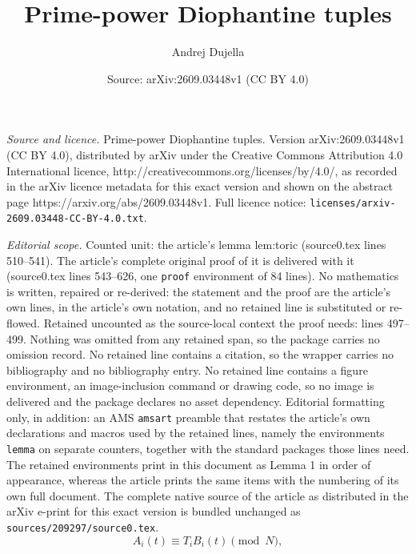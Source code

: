\documentclass[10pt,a4paper]{amsart}
\title{Prime-power Diophantine tuples}
\author{Andrej Dujella}
\date{Source: arXiv:2609.03448v1 (CC BY 4.0)}
\begin{document}
\maketitle

\noindent\emph{Source and licence.} Prime-power Diophantine tuples. Version arXiv:2609.03448v1 (CC BY 4.0), distributed by arXiv under the Creative Commons Attribution 4.0 International licence, http://creativecommons.org/licenses/by/4.0/, as recorded in the arXiv licence metadata for this exact version and shown on the abstract page https://arxiv.org/abs/2609.03448v1. Full licence notice: \texttt{licenses/arxiv-2609.03448-CC-BY-4.0.txt}.\par\smallskip

\noindent\textit{Editorial scope.} Counted unit: the article's lemma lem:toric (source0.tex lines 510--541). The article's complete original proof of it is delivered with it (source0.tex lines 543--626, one \texttt{proof} environment of 84 lines). No mathematics is written, repaired or re-derived: the statement and the proof are the article's own lines, in the article's own notation, and no retained line is substituted or re-flowed.  Retained uncounted as the source-local context the proof needs: lines 497--499.  Nothing was omitted from any retained span, so the package carries no omission record.  No retained line contains a citation, so the wrapper carries no bibliography and no bibliography entry.  No retained line contains a figure environment, an image-inclusion command or drawing code, so no image is delivered and the package declares no asset dependency.  Editorial formatting only, in addition: an AMS \texttt{amsart} preamble that restates the article's own declarations and macros used by the retained lines, namely the environments \texttt{lemma} on separate counters, together with the standard packages those lines need.  The retained environments print in this document as Lemma 1 in order of appearance, whereas the article prints the same items with the numbering of its own full document.  The complete native source of the article as distributed in the arXiv e-print for this exact version is bundled unchanged as \texttt{sources/209297/source0.tex}.
\begin{equation}\label{eq:AiBi}
 A_i(t)\equiv T_iB_i(t)\pmod N,
\end{equation}
\end{document}
